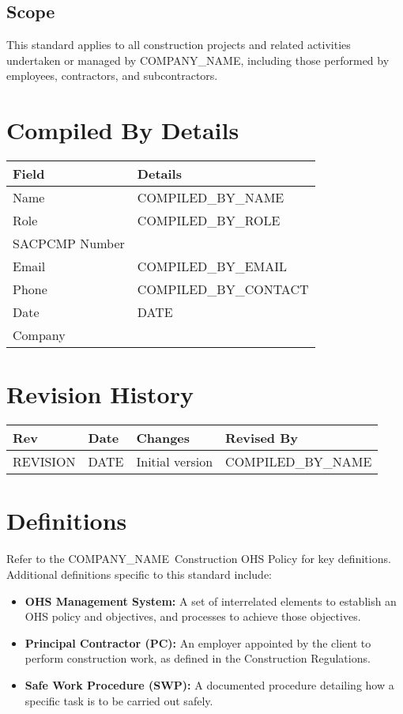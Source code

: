 \documentclass[11pt]{article}
\newcommand{\issueDate}{{{DATE}}}
\newcommand{\clientName}{{{COMPANY_NAME}}}
\newcommand{\compilerName}{{{COMPILED_BY_NAME}}}
\newcommand{\compilerRole}{{{COMPILED_BY_ROLE}}}
\newcommand{\compilerSACPCMP}{}
\newcommand{\compilerEmail}{{{COMPILED_BY_EMAIL}}}
\newcommand{\compilerPhone}{{{COMPILED_BY_CONTACT}}}
\newcommand{\compilerCompany}{}
\newcommand{\revision}{{{REVISION}}}
\begin{document}
\subsection{Scope}
This standard applies to all construction projects and related activities undertaken or managed by \clientName, including those performed by employees, contractors, and subcontractors.

\section{Compiled By Details}
\begin{tabularx}{\textwidth}{lX}
  \toprule
  \textbf{Field} & \textbf{Details} \\
  \midrule
  Name & \compilerName \\
  Role & \compilerRole \\
  SACPCMP Number & \compilerSACPCMP \\
  Email & \compilerEmail \\
  Phone & \compilerPhone \\
  Date & \issueDate \\
  Company & \compilerCompany \\
  \bottomrule
\end{tabularx}

\section{Revision History}
\begin{tabularx}{\textwidth}{lXll}
  \toprule
  \textbf{Rev} & \textbf{Date} & \textbf{Changes} & \textbf{Revised By} \\
  \midrule
  \revision & \issueDate & Initial version & \compilerName \\
  \bottomrule
\end{tabularx}

\section{Definitions}
Refer to the \clientName\ Construction OHS Policy for key definitions. Additional definitions specific to this standard include:
\begin{itemize}
    \item \textbf{OHS Management System:} A set of interrelated elements to establish an OHS policy and objectives, and processes to achieve those objectives.
    \item \textbf{Principal Contractor (PC):} An employer appointed by the client to perform construction work, as defined in the Construction Regulations.
    \item \textbf{Safe Work Procedure (SWP):} A documented procedure detailing how a specific task is to be carried out safely.
\end{itemize}
\end{document}
